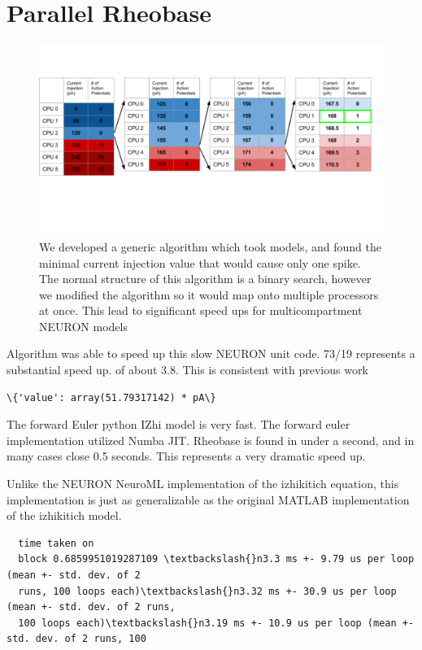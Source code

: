 \section{Parallel Rheobase}


\begin{figure}    
  \begin{center}
  \includegraphics[width=0.7\linewidth]{figures/rheobase_algorithm.png}
    \caption{We developed a generic algorithm which took models, and found the minimal current injection value that would cause only one spike. The normal structure of this algorithm is a binary search, however we modified the algorithm so it would map onto multiple processors at once. This lead to significant speed ups for multicompartment NEURON models}

  \end{center}
\end{figure} 

Algorithm was able to speed up this slow NEURON unit code. 73/19
represents a substantial speed up. of about 3.8. This is consistent with
previous work

\begin{Verbatim}
\{'value': array(51.79317142) * pA\}
\end{Verbatim}
        
    The forward Euler python IZhi model is very fast. The forward euler
implementation utilized Numba JIT. Rheobase is found in under a second,
and in many cases close 0.5 seconds. This represents a very dramatic
speed up.

Unlike the NEURON NeuroML implementation of the izhikitich equation,
this implementation is just as generalizable as the original MATLAB
implementation of the izhikitich model.


\begin{Verbatim}
  time taken on
  block 0.6859951019287109 \textbackslash{}n3.3 ms +- 9.79 us per loop (mean +- std. dev. of 2
  runs, 100 loops each)\textbackslash{}n3.32 ms +- 30.9 us per loop (mean +- std. dev. of 2 runs,
  100 loops each)\textbackslash{}n3.19 ms +- 10.9 us per loop (mean +- std. dev. of 2 runs, 100

\end{Verbatim}
        
